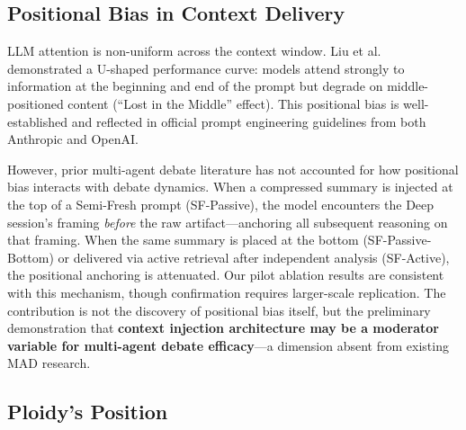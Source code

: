 \documentclass[11pt]{article}
\begin{document}
\subsection{Positional Bias in Context Delivery}
\label{sec:positional-bias}

LLM attention is non-uniform across the context window. Liu et al.~\citep{liu2023lost} demonstrated a U-shaped performance curve: models attend strongly to information at the beginning and end of the prompt but degrade on middle-positioned content (``Lost in the Middle'' effect). This positional bias is well-established and reflected in official prompt engineering guidelines from both Anthropic and OpenAI.

However, prior multi-agent debate literature has not accounted for how positional bias interacts with debate dynamics. When a compressed summary is injected at the top of a Semi-Fresh prompt (SF-Passive), the model encounters the Deep session's framing \emph{before} the raw artifact---anchoring all subsequent reasoning on that framing. When the same summary is placed at the bottom (SF-Passive-Bottom) or delivered via active retrieval after independent analysis (SF-Active), the positional anchoring is attenuated. Our pilot ablation results are consistent with this mechanism, though confirmation requires larger-scale replication. The contribution is not the discovery of positional bias itself, but the preliminary demonstration that \textbf{context injection architecture may be a moderator variable for multi-agent debate efficacy}---a dimension absent from existing MAD research.

\subsection{Ploidy's Position}
\label{sec:position}
\end{document}
